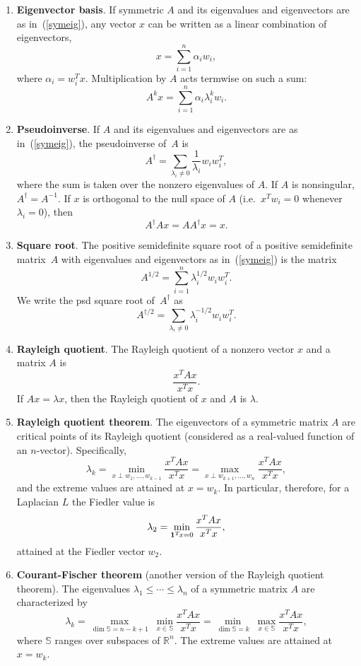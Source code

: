 \documentclass[11pt]{article}
\newcommand{\m}[1]{{\bf{#1}}}       %
\newcommand{\ones}{\m1}             %
\newcommand{\pinv}{^{\dagger}}                  %
\newcommand{\Real}{\mathbb{R}}      %
\begin{document}
\begin{enumerate}
\item{\bf Eigenvector basis}.
If symmetric $A$ and its eigenvalues and eigenvectors are as in~(\ref{symeig}), 
any vector $x$ can be written as a linear combination of eigenvectors,
$$x = \sum_{i=1}^n \alpha_i w_i,$$
where $\alpha_i = w_i^Tx.$  
Multiplication by $A$ acts termwise on such a sum:
$$A^k x = \sum_{i=1}^n \alpha_i\lambda_i^k w_i.$$

\item{\bf Pseudoinverse}.
If $A$ and its eigenvalues and eigenvectors 
are as in~(\ref{symeig}), 
the pseudoinverse of~$A$ is
$$A\pinv = \sum_{\lambda_i\ne 0} \frac{1}{\lambda_i} w_iw_i^T,$$
where the sum is taken over the nonzero eigenvalues of $A$.
If $A$ is nonsingular, $A\pinv=A^{-1}$.
If $x$ is orthogonal to the null space of $A$ 
(i.e.\ $x^Tw_i=0$ whenever $\lambda_i=0$), then
$$A\pinv A x = AA\pinv x = x.$$

\item{\bf Square root}.
The positive semidefinite square root of a positive semidefinite matrix~$A$
with eigenvalues and eigenvectors as in~(\ref{symeig}) is the matrix
$$A^{1/2} = \sum_{i=1}^n \lambda_i^{1/2} w_iw_i^T.$$
We write the psd square root of~$A\pinv$ as 
$$A^{\dagger/2} = \sum_{\lambda_i\ne 0} \lambda_i^{-1/2} w_iw_i^T.$$

\item{\bf Rayleigh quotient}.
The Rayleigh quotient of a nonzero vector $x$ and a matrix $A$ is
$$\frac{x^TAx}{x^Tx}.$$
If $Ax=\lambda x$, then the Rayleigh quotient of $x$ and $A$ is $\lambda$.

\item\label{RQT}{\bf Rayleigh quotient theorem}.
The eigenvectors of a symmetric matrix $A$ are critical points of its
Rayleigh quotient (considered as a real-valued function of an $n$-vector).
Specifically, 
$$\lambda_k = \min_{x\perp w_1,\ldots,w_{k-1}} \frac{x^TAx}{x^Tx}
            = \max_{x\perp w_{k+1},\ldots,w_n} \frac{x^TAx}{x^Tx},$$
and the extreme values are attained at $x = w_k$.
In particular, therefore, for a Laplacian $L$ the Fiedler value is
$$\lambda_2 = \min_{\ones^T\!x=0} \frac{x^TAx}{x^Tx},$$
attained at the Fiedler vector $w_2$.

\item\label{CFT}{\bf Courant-Fischer theorem}
(another version of the Rayleigh quotient theorem).
The eigenvalues $\lambda_1\leq\cdots\leq\lambda_n$ of a symmetric matrix $A$ 
are characterized by
$$\lambda_k = \max_{\dim \mathbb{S}=n-k+1}\;\min_{x\in \mathbb{S}}\frac{x^TAx}{x^Tx}
            = \min_{\dim \mathbb{S}=k}\;\max_{x\in \mathbb{S}}\frac{x^TAx}{x^Tx},$$
where $\mathbb{S}$ ranges over subspaces of $\Real^n$.
The extreme values are attained at $x = w_k$.


\end{enumerate}
\end{document}
